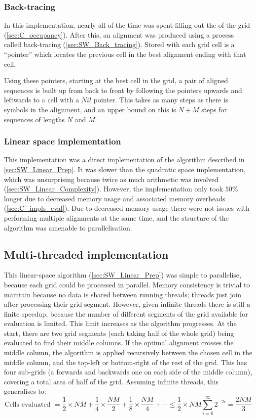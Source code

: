 \subsubsection{Back-tracing}
\label{sec:Initial_C_back_tracing}
In this implementation, nearly all of the time was spent filling out the of the grid (\cref{sec:C_occupancy}).
After this, an alignment was produced using a process called back-tracing (\cref{sec:SW_Back_tracing}). Stored with each grid cell is a ``pointer'' which locates the previous cell in the best alignment ending with that cell.

Using these pointers, starting at the best cell in the grid, a pair of aligned sequences is built up from back to front by following the pointers upwards and leftwards to a cell with a $Nil$ pointer.
This takes as many steps as there is symbols in the alignment, and an upper bound on this is $N+M$ steps for sequences of lengths $N$ and $M$.

\subsubsection{Linear space implementation}
\label{sec:Initial_C_Linear}
This implementation was a direct implementation of the algorithm described in \cref{sec:SW_Linear_Prep}.
It was slower than the quadratic space implementation, which was unsurprising because twice as much arithmetic was involved (\cref{sec:SW_Linear_Complexity}).
However, the implementation only took $50\%$ longer due to decreased memory usage and associated memory overheads (\cref{sec:C_impls_eval}).
Due to decreased memory usage there were not issues with performing multiple alignments at the same time, and the structure of the algorithm was amenable to parallelisation.

\subsection{Multi-threaded implementation}
\label{sec:Multi_threaded_C_impl}
This linear-space algorithm (\cref{sec:SW_Linear_Prep}) was simple to parallelise, because each grid could be processed in parallel.
Memory consistency is trivial to maintain because no data is shared between running threads; threads just join after processing their grid segment.
However, given infinite threads there is still a finite speedup, because the number of different segments of the grid available for evaluation is limited.
This limit increases as the algorithm progresses.
At the start, there are two grid segments (each taking half of the whole grid) being evaluated to find their middle columns.
If the optimal alignment crosses the middle column, the algorithm is applied recursively between the chosen cell in the middle column, and the top-left or bottom-right of the rest of the grid.
This has four sub-grids (a forwards and backwards one on each side of the middle column), covering a total area of half of the grid. Assuming infinite threads, this generalises to:
$$\text{Cells evaluated } = \frac{1}{2} \times NM + \frac{1}{4} \times \frac{NM}{2} + \frac{1}{8} \times \frac{NM}{4} + \cdots \leq \frac{1}{2} \times NM \sum_{i=0}^\infty 2^{-2i} = \frac{2NM}{3}$$

